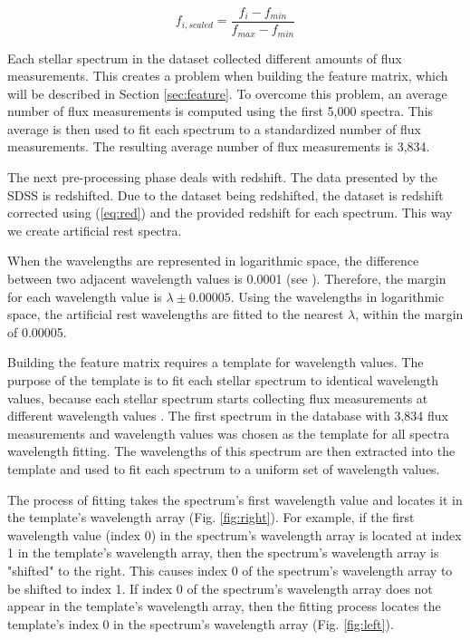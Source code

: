 \documentclass[conference]{IEEEtran}
\begin{document}
        \begin{equation}\label{eq:scale}
            f_{i, scaled} = \frac{f_i - f_{min}}{f_{max} - f_{min}}
        \end{equation}
        
	Each stellar spectrum in the dataset collected different amounts of flux measurements. This creates a problem when building the feature matrix, which will be described in Section \ref{sec:feature}. To overcome this problem, an average number of flux measurements is computed using the first 5,000 spectra. This average is then used to fit each spectrum to a standardized number of flux measurements. The resulting average number of flux measurements is 3,834.
        
	The next pre-processing phase deals with redshift. The data presented by the SDSS is redshifted. Due to the dataset being redshifted, the dataset is redshift corrected using (\ref{eq:red}) and the provided redshift for each spectrum. This way we create artificial rest spectra.

When the wavelengths are represented in logarithmic space, the difference between two adjacent wavelength values is 0.0001 (see \cite{dr14}). Therefore, the margin for each wavelength value is $\lambda\pm0.00005$. Using the wavelengths in logarithmic space, the artificial rest wavelengths are fitted to the nearest $\lambda$, within the margin of 0.00005.

        Building the feature matrix requires a template for wavelength values. The purpose of the template is to fit each stellar spectrum to identical wavelength values, because each stellar spectrum starts collecting flux measurements at different wavelength values \cite{dr14}. The first spectrum in the database with 3,834 flux measurements and wavelength values was chosen as the template for all spectra wavelength fitting. The wavelengths of this spectrum are then extracted into the template and used to fit each spectrum to a uniform set of wavelength values.

	The process of fitting takes the spectrum's first wavelength value and locates it in the template's wavelength array (Fig. \ref{fig:right}). For example, if the first wavelength value (index 0) in the spectrum's wavelength array is located at index 1 in the template's wavelength array, then the spectrum's wavelength array is "shifted" to the right. This causes index 0 of the spectrum's wavelength array to be shifted to index 1. If index 0 of the spectrum's wavelength array does not appear in the template's wavelength array, then the fitting process locates the template's index 0 in the spectrum's wavelength array (Fig. \ref{fig:left}).
        
\end{document}
